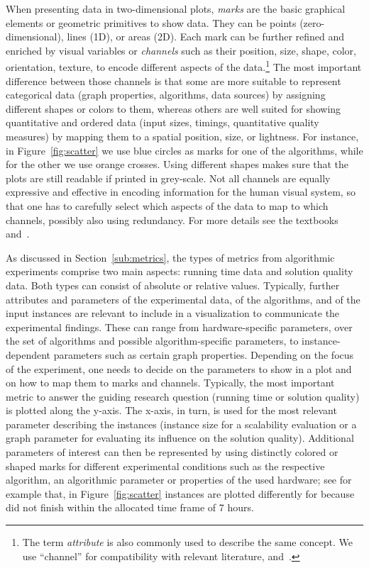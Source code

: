 \documentclass[algorithms,article,submit,moreauthors,pdftex]{Definitions/mdpi}
\newcommand{\changed}[1]{#1}
\newcommand{\removed}[1]{}
\begin{document}
When presenting data in two-dimensional plots, \emph{marks} are the basic graphical elements or geometric primitives to show data.
They can be points (zero-dimensional), lines (1D), or areas (2D).
Each mark can be further refined and enriched by visual variables or \emph{channels} such as their position, size, shape, color, orientation, texture, \etc to encode different aspects of the data.\footnote{\changed{The term \emph{attribute} is also commonly used to describe the same concept.
 We use ``channel'' for compatibility with relevant literature, \ie \cite{m-vad-14} and~\cite{w-ivpd-12}.}}
The most important difference between those channels is that some are more suitable to represent categorical data (\eg graph properties, algorithms, data sources) by assigning different shapes or colors to them, whereas others are well suited for showing quantitative and ordered data (\eg input sizes, timings, quantitative quality measures) by mapping them to a spatial position, size, or lightness.
For instance, in Figure~\ref{fig:scatter} we use blue circles as marks for one of the algorithms,
while for the other we use orange crosses.
Using different shapes makes sure that the plots are still readable if printed in grey-scale.
Not all channels are equally expressive and effective in encoding information for the human visual system, so that one has to carefully select which aspects of the data to map to which channels, possibly also using redundancy.
For more details see the textbooks~\cite{m-vad-14} and~\cite{w-ivpd-12}.


As discussed in Section~\ref{sub:metrics}, the types of metrics from algorithmic experiments comprise two main aspects: running time data and solution quality data.
Both types \removed{of metrics} can consist of absolute or relative values.
Typically, further attributes and parameters of the experimental data, of the algorithms, and of the input instances are relevant to include in a visualization to communicate the experimental findings.
These can range from hardware-specific parameters, over the set of algorithms and possible algorithm-specific parameters, to instance-dependent parameters such as certain graph properties.
Depending on the \changed{focus of the experiment}, one needs to decide on the parameters to show in a plot and on how to map them to marks and channels.
Typically, the most important metric to answer the guiding research question (\eg running time or solution quality) is plotted along the y-axis.
The x-axis, in turn, is used for the most relevant parameter describing the instances (\eg instance size for a scalability evaluation or a graph parameter for evaluating its influence on the solution quality).
Additional parameters of interest can then be represented by using distinctly colored or shaped marks for different experimental conditions such as the respective algorithm, an algorithmic parameter or properties of the used hardware; see for example that, in Figure~\ref{fig:scatter} instances \changed{\onlyKadInstances}
are plotted differently \changed{for \kad} because \rk did not finish within the allocated time frame of 7 hours.
\end{document}
